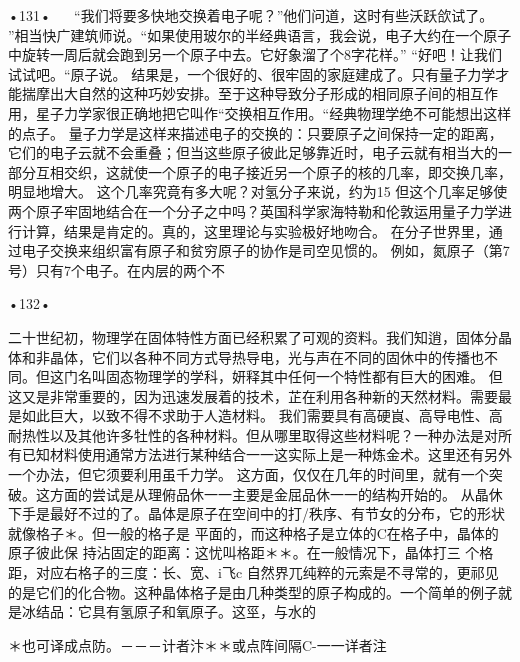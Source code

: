 •131•
  
“我们将要多快地交换着电子呢？”他们问道，这时有些沃跃欱试了。
”相当快广建筑师说。“如果使用玻尔的半经典语言，我会说，电子大约在一个原子中旋转一周后就会跑到另一个原子中去。它好象溜了个8字花样。”
“好吧！让我们试试吧。“原子说。
结果是，一个很好的、很牢固的家庭建成了。只有量子力学才能揣摩出大自然的这种巧妙安排。至于这种导致分子形成的相同原子间的相互作用，星子力学家很正确地把它叫作“交换相互作用。“经典物理学绝不可能想出这样的点子。
量子力学是这样来描述电子的交换的：只要原子之间保持一定的距离，它们的电子云就不会重叠；但当这些原子彼此足够靠近时，电子云就有相当大的一部分互相交织，这就使一个原子的电子接近另一个原子的核的几率，即交换几率，明显地增大。
这个几率究竟有多大呢？对氢分子来说，约为15%
但这个几率足够使两个原子牢固地结合在一个分子之中吗？英国科学家海特勒和伦敦运用量子力学进行计算，结果是肯定的。真的，这里理论与实验极好地吻合。
在分子世界里，通过电子交换来组织富有原子和贫穷原子的协作是司空见惯的。
例如，氮原子（第7号）只有7个电子。在内层的两个不

•132•
  

二十世纪初，物理学在固体特性方面已经积累了可观的资料。我们知逍，固体分晶体和非晶体，它们以各种不同方式导热导电，光与声在不同的固休中的传播也不同。但这门名叫固态物理学的学科，妍释其中任何一个特性都有巨大的困难。
但这又是非常重要的，因为迅速发展着的技术，芷在利用各种新的天然材料。需要最是如此巨大，以致不得不求助于人造材料。
我们需要具有高硬峎、高导电性、高耐热性以及其他许多牡性的各种材料。但从哪里取得这些材料呢？一种办法是对所有已知材料使用通常方法进行某种结合一一这实际上是一种炼金术。这里还有另外一个办法，但它须要利用虽千力学。
这方面，仅仅在几年的时间里，就有一个突破。这方面的尝试是从理俯品休一一主要是金屈品休一一的结构开始的。
从晶休下手是最好不过的了。晶体是原子在空间中的打/秩序、有节女的分布，它的形状就像格子＊。但一般的格子是
平面的，而这种格子是立体的C在格子中，晶体的原子彼此保
持沾固定的距离：这忧叫格距＊＊。在一般情况下，晶体打三
个格距，对应右格子的三度：长、宽、i飞c
自然界兀纯粹的元索是不寻常的，更祁见的是它们的化合物。这种晶体格子是由几种类型的原子构成的。一个简单的例子就是冰结品：它具有氢原子和氧原子。这巠，与水的

＊也可译成点防。－－－计者汴＊＊或点阵间隔C-一一详者注

